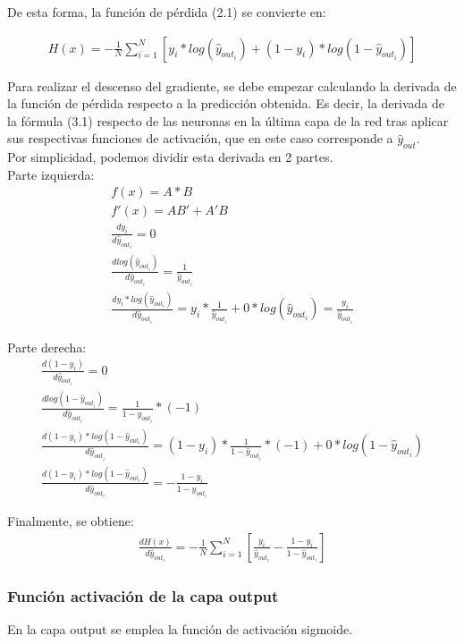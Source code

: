 De esta forma, la función de pérdida (2.1) se convierte en:

\begin{gather}
	H(x) = - \frac{1}{N} \sum_{i=1}^{N}  [y_i * log( \hat{y}_{out_i}) + (1-y_i)*log(1-\hat{y}_{out_i})]
\end{gather}

Para realizar el descenso del gradiente, se debe empezar calculando la derivada de la función de pérdida respecto a la predicción obtenida. Es decir, la derivada de la fórmula (3.1) respecto de las neuronas en la última capa de la red tras aplicar sus respectivas funciones de activación, que en este caso corresponde a $\hat{y}_{out}$. \\
Por simplicidad, podemos dividir esta derivada en 2 partes. \\
Parte izquierda:
\begin{gather}
	f(x) = A*B \\  
	f'(x) = AB' + A'B \\
	\frac{dy_i}{d\hat{y}_{out_i}} = 0 \\
	\frac{dlog(\hat{y}_{out_i} )}{d\hat{y}_{out_i}} = \frac{1}{\hat{y}_{out_i}} \\
	\frac{dy_i * log( \hat{y}_{out_i})}{d\hat{y}_{out_i}} = y_i*\frac{1}{\hat{y}_{out_i}} + 0*log(\hat{y}_{out_i} ) = \frac{y_i}{\hat{y}_{out_i}}
\end{gather}

Parte derecha:
\begin{gather}
	\frac{d(1-y_i)}{d\hat{y}_{out_i}} = 0\\
	\frac{dlog(1-\hat{y}_{out_i})}{d\hat{y}_{out_i}} = \frac{1}{1-\hat{y}_{out_i}} * (-1) \\
	\frac{d(1-y_i)*log(1-\hat{y}_{out_i})}{d\hat{y}_{out_i}} = (1-y_i)*\frac{1}{1-\hat{y}_{out_i}}*(-1) + 0* log(1-\hat{y}_{out_i}) \\
	\frac{d(1-y_i)*log(1-\hat{y}_{out_i})}{d\hat{y}_{out_i}} = -\frac{1-y_i}{1-\hat{y}_{out_i}}
\end{gather}

Finalmente, se obtiene: 
\begin{gather}
	\frac{dH(x)}{d\hat{y}_{out_i}} = - \frac{1}{N} \sum_{i=1}^{N}  [ \frac{y_i}{\hat{y}_{out_i}} - \frac{1-y_i}{1-\hat{y}_{out_i}} ]
\end{gather}

\subsubsection{Función activación de la capa output}
En la capa output se emplea la función de activación sigmoide. 

